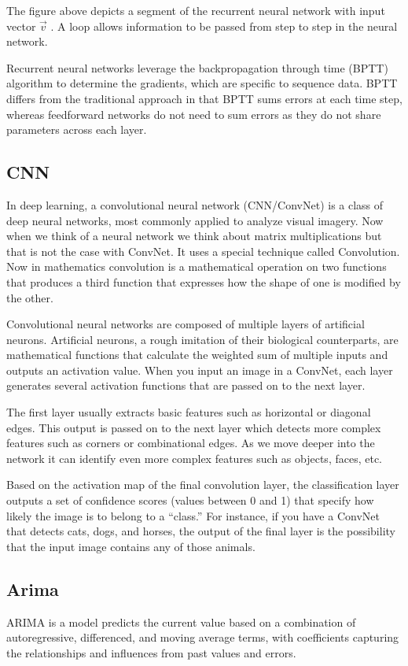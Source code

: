 \documentclass{ieeeojies}
\begin{document}
The figure above depicts a segment of the recurrent neural network with input vector \(\vec{v}\) . A loop allows information to be passed from step to step in the neural network.

Recurrent neural networks leverage the backpropagation through time (BPTT) algorithm to determine the gradients, which are specific to sequence data. BPTT differs from the traditional approach in that BPTT sums errors at each time step, whereas feedforward networks do not need to sum errors as they do not share parameters across each layer.\cite{r16}


\subsection{CNN}
In deep learning, a convolutional neural network (CNN/ConvNet) is a class of deep neural networks, most commonly applied to analyze visual imagery. Now when we think of a neural network we think about matrix multiplications but that is not the case with ConvNet. It uses a special technique called Convolution. Now in mathematics convolution is a mathematical operation on two functions that produces a third function that expresses how the shape of one is modified by the other.

Convolutional neural networks are composed of multiple layers of artificial neurons. Artificial neurons, a rough imitation of their biological counterparts, are mathematical functions that calculate the weighted sum of multiple inputs and outputs an activation value. When you input an image in a ConvNet, each layer generates several activation functions that are passed on to the next layer.

The first layer usually extracts basic features such as horizontal or diagonal edges. This output is passed on to the next layer which detects more complex features such as corners or combinational edges. As we move deeper into the network it can identify even more complex features such as objects, faces, etc.

Based on the activation map of the final convolution layer, the classification layer outputs a set of confidence scores (values between 0 and 1) that specify how likely the image is to belong to a “class.” For instance, if you have a ConvNet that detects cats, dogs, and horses, the output of the final layer is the possibility that the input image contains any of those animals.\cite{r17}


\subsection{Arima}
ARIMA is a model predicts the current value based on a combination of autoregressive, differenced, and moving average terms, with coefficients capturing the relationships and influences from past values and errors. \cite{r20}
\end{document}
